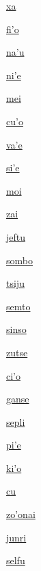 {\hyperlink{val:xa}{xa}}{}{}{}

{\hyperlink{val:fiho}{fi'o}}{}{}{}

{\hyperlink{val:nahu}{na'u}}{}{}{}

{\hyperlink{val:nihe}{ni'e}}{}{}{}

{\hyperlink{val:mei}{mei}}{}{}{}

{\hyperlink{val:cuho}{cu'o}}{}{}{}

{\hyperlink{val:vahe}{va'e}}{}{}{}

{\hyperlink{val:sihe}{si'e}}{}{}{}

{\hyperlink{val:moi}{moi}}{}{}{}

{\hyperlink{val:zai}{zai}}{}{}{}

{\hyperlink{val:jeftu}{jeftu}}{}{}{}

{\hyperlink{val:sombo}{sombo}}{}{}{}

{\hyperlink{val:tsiju}{tsiju}}{}{}{}

{\hyperlink{val:semto}{semto}}{}{}{}

{\hyperlink{val:sinso}{sinso}}{}{}{}

{\hyperlink{val:zutse}{zutse}}{}{}{}

{\hyperlink{val:ciho}{ci'o}}{}{}{}

{\hyperlink{val:ganse}{ganse}}{}{}{}

{\hyperlink{val:sepli}{sepli}}{}{}{}

{\hyperlink{val:pihe}{pi'e}}{}{}{}

{\hyperlink{val:kiho}{ki'o}}{}{}{}

{\hyperlink{val:cu}{cu}}{}{}{}

{\hyperlink{val:zohonai}{zo'onai}}{}{}{}

{\hyperlink{val:junri}{junri}}{}{}{}

{\hyperlink{val:selfu}{selfu}}{}{}{}

